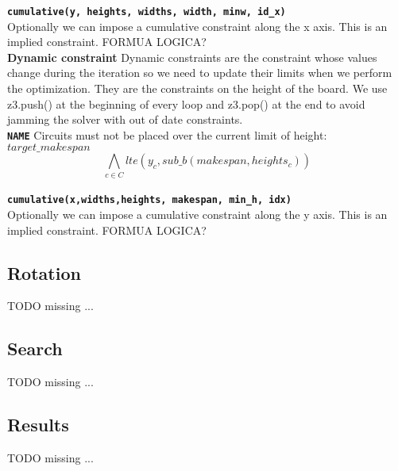   \texttt\textbf{cumulative(y, heights, widths, width, minw, id\_x) }\\ 
  Optionally we can impose a cumulative constraint along the x axis. This is an implied
  constraint. FORMUA LOGICA?\\

  \textbf{Dynamic constraint}
  Dynamic constraints are the constraint whose values change during the iteration so we
  need to update their limits when we perform the optimization. They are the constraints 
  on the height of the board. We use z3.push() at the beginning of every loop and z3.pop()
  at the end to avoid jamming the solver with out of date constraints.\\

  \texttt\textbf{NAME} Circuits must not be placed over the current limit of height: 
  $target\_makespan$ \\
  \begin{equation}
      \bigwedge\limits_{c \in C} lte(y_c, sub\_b(makespan, heights_c))
  \end{equation}\\

  \texttt\textbf{cumulative(x,widths,heights, makespan, min\_h, idx)} \\
  Optionally we can impose a cumulative constraint along the y axis. This is an implied
  constraint. FORMUA LOGICA?



\subsection{Rotation}\label{subsec:rotation}
    \colorbox{BurntOrange}{TODO missing ...}


\subsection{Search}\label{subsec:search}
    \colorbox{BurntOrange}{TODO missing ...}


\subsection{Results}\label{subsec:results}
    \colorbox{BurntOrange}{TODO missing ...}
